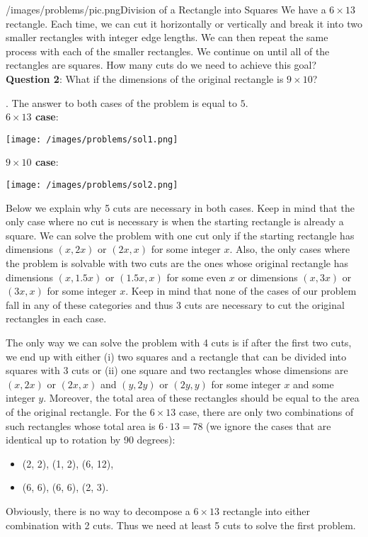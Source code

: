 \begin{problem}{/images/problems/pic.png}{Division of a Rectangle into Squares}
	We have a $6 \times 13$ rectangle. Each time, we can cut it horizontally or vertically and break it into two smaller rectangles with integer edge lengths. We can then repeat the same process with each of the smaller rectangles. We continue on until all of the rectangles are squares. How many cuts do we need to achieve this goal?\\[0.2cm]
	
\textbf{Question 2}: What if the dimensions of the original rectangle is $9 \times 10$?
\end{problem}
\begin{solution}.
The answer to both cases of the problem is equal to $5$.\\[0.2cm]
\noindent \textbf{$6 \times 13$ case}: 
\begin{center}
	\texttt{[image: /images/problems/sol1.png]}
\end{center}
\noindent \textbf{$9 \times 10$ case}: 
\begin{center}
	\texttt{[image: /images/problems/sol2.png]}
\end{center}
Below we explain why 5 cuts are necessary in both cases. Keep in mind that the only case where no cut is necessary is when the starting rectangle is already a square. We can solve the problem with one cut only if the starting rectangle has dimensions $(x,2x)$ or $(2x,x)$ for some integer $x$. Also, the only cases where the problem is solvable with two cuts are the ones whose original rectangle has dimensions $(x,1.5x)$ or $(1.5x, x)$ for some even $x$ or dimensions $(x,3x)$ or $(3x,x)$ for some integer $x$. Keep in mind that none of the cases of our problem fall in any of these categories and thus 3 cuts are necessary to cut the original rectangles in each case.

The only way we can solve the problem with 4 cuts is if after the first two cuts, we end up with either (i) two squares and a rectangle that can be divided into squares with 3 cuts or (ii) one square and two rectangles whose dimensions are $(x,2x)$ or $(2x,x)$ and $(y,2y)$ or $(2y,y)$ for some integer $x$ and some integer $y$. Moreover, the total area of these rectangles should be equal to the area of the original rectangle. For the $6 \times 13$ case, there are only two combinations of such rectangles whose total area is $6\cdot 13 = 78$ (we ignore the cases that are identical up to rotation by 90 degrees):
\begin{itemize}
	\item (2, 2), (1, 2), (6, 12),
	\item (6, 6), (6, 6), (2, 3).
\end{itemize} 
Obviously, there is no way to decompose a $6 \times 13$ rectangle into either combination with 2 cuts. Thus we need at least 5 cuts to solve the first problem.


\end{solution}
